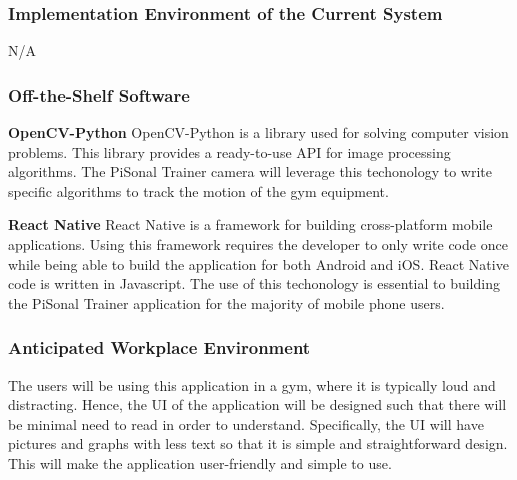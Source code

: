 \documentclass{article}
\begin{document}



\subsubsection{Implementation Environment of the Current System}
N/A

\subsubsection{Off-the-Shelf Software}
\textbf{OpenCV-Python}
OpenCV-Python is a library used for solving computer vision problems. This library provides a ready-to-use API for image processing algorithms. The PiSonal Trainer camera will leverage this techonology to write specific algorithms to track the motion of the gym equipment.

\textbf{React Native}
React Native is a framework for building cross-platform mobile applications. Using this framework requires the developer to only write code once while being able to build the application for both Android and iOS. React Native code is written in Javascript.
The use of this techonology is essential to building the PiSonal Trainer application for the majority of mobile phone users.


\subsubsection{Anticipated Workplace Environment}
The users will be using this application in a gym, where it is typically loud and distracting. Hence, the UI of the application will be designed such that there will be minimal need to read in order to understand. Specifically, the UI will have pictures and graphs with less text so that it is simple and straightforward design. This will make the application user-friendly and simple to use.
\end{document}
